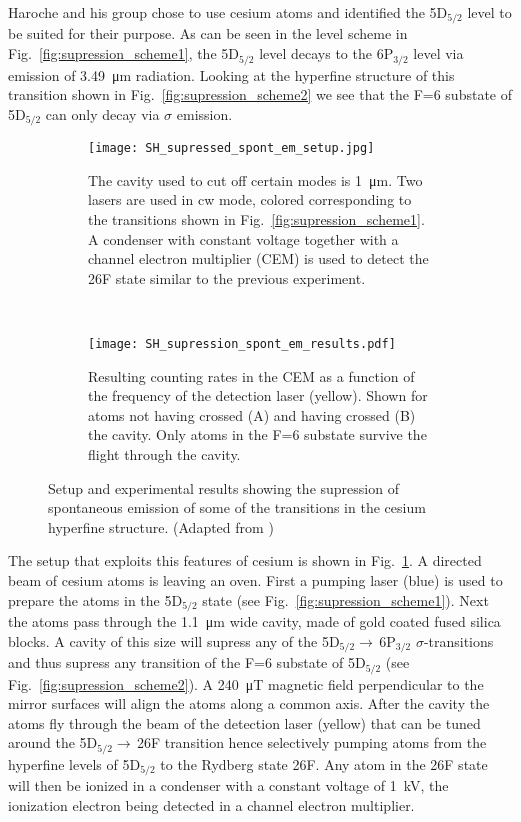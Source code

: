 Haroche and his group chose to use cesium atoms and identified the 5D$_{5/2}$
level to be suited for their purpose. As can be seen in the level scheme in
Fig.~\ref{fig:supression_scheme1}, the 5D$_{5/2}$ level decays to the 6P$_{3/2}$
level via emission of \SI{3.49}{\micro\meter} radiation. Looking at the
hyperfine structure of this transition  shown in
Fig.~\ref{fig:supression_scheme2} we see that the F=6 substate of
5D$_{5/2}$ can only decay via $\sigma$ emission.  


\begin{figure}[t]
  \centering
  \begin{subfigure}[t]{.48\linewidth}
    \centering
    \texttt{[image: SH\_supressed\_spont\_em\_setup.jpg]}
    \caption{The cavity used to cut off certain modes is \SI{1}{\micro\m}. Two
    lasers are used in cw mode, colored corresponding to the transitions shown
    in Fig.~\ref{fig:supression_scheme1}. A condenser with constant voltage
    together with a channel electron multiplier (CEM) is
    used to detect the 26F state similar to the previous experiment.}
    \label{fig:supression_setup}
  \end{subfigure}
  ~
  \begin{subfigure}[t]{.48\linewidth}
    \centering
    \texttt{[image: SH\_supression\_spont\_em\_results.pdf]}
    \caption{Resulting counting rates in the CEM as a function of the frequency
      of the detection laser (yellow). Shown for atoms not having crossed (A) and having
  crossed (B) the cavity. Only atoms in the F=6 substate survive the flight
through the cavity.}
  \label{fig:supression_results}
  \end{subfigure}
  \caption{Setup and experimental results showing the supression of spontaneous
  emission of some of the transitions in the cesium hyperfine structure.
  (Adapted from \cite{haroche1987SupressedEmission})}
\end{figure}
The setup that exploits this features of cesium is shown in
Fig.~\ref{fig:supression_setup}. A directed beam of cesium atoms is leaving an
oven. First a pumping laser (blue) is used to prepare the
atoms in the 5D$_{5/2}$ state (see Fig.~\ref{fig:supression_scheme1}). Next the
atoms pass through the \SI{1.1}{\micro\meter} wide cavity, made of gold coated
fused silica blocks. A cavity of this size will supress any of the
5D$_{5/2}\rightarrow$\,6P$_{3/2}$ $\sigma$-transitions and thus supress any
transition of the F=6 substate of 5D$_{5/2}$ (see
Fig.~\ref{fig:supression_scheme2}). A \SI{240}{\micro\tesla} magnetic field
perpendicular to the mirror surfaces will align the atoms along a common axis.
After the cavity the atoms fly through the beam of the detection laser (yellow)
that can be tuned around the 5D$_{5/2}\rightarrow$\,26F transition hence
selectively pumping atoms from the hyperfine levels of 5D$_{5/2}$ to the Rydberg
state 26F. Any atom in the 26F state will then be ionized in a condenser with a
constant voltage of \SI{1}{\kilo\volt}, the ionization electron being detected
in a channel electron multiplier.

